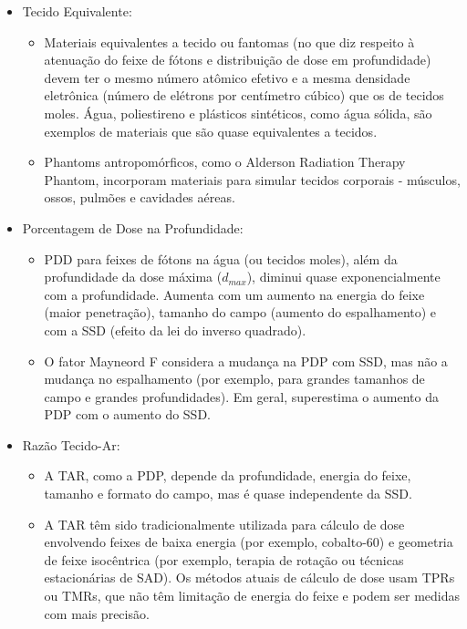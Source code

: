 \documentclass[11pt,a4paper]{article}
\newcounter{exemplo}
\begin{document}
	\begin{exemplo}
		\begin{itemize}
			\item Tecido Equivalente:
				\begin{itemize}[label=\textcolor{CarnationPink}{$\star$}]
					\item Materiais equivalentes a tecido ou fantomas (no que diz respeito à atenuação do feixe de fótons e distribuição de dose em profundidade) devem ter o mesmo número atômico efetivo e a mesma densidade eletrônica (número de elétrons por centímetro cúbico) que os de tecidos moles. Água, poliestireno e plásticos sintéticos, como água sólida, são exemplos de materiais que são quase equivalentes a tecidos.
					\item Phantoms antropomórficos, como o Alderson Radiation Therapy Phantom, incorporam materiais para simular tecidos corporais - músculos, ossos, pulmões e cavidades aéreas.
				\end{itemize}
			\item Porcentagem de Dose na Profundidade:
				\begin{itemize}[label=\textcolor{CarnationPink}{$\star$}]
					\item PDD para feixes de fótons na água (ou tecidos moles), além da profundidade da dose máxima ($d_{max}$), diminui quase exponencialmente com a profundidade. Aumenta com um aumento na energia do feixe (maior penetração), tamanho do campo (aumento do espalhamento) e com a SSD (efeito da lei do inverso quadrado).
					\item O fator Mayneord F considera a mudança na PDP com SSD, mas não a mudança no espalhamento (por exemplo, para grandes tamanhos de campo e grandes profundidades). Em geral, superestima o aumento da PDP com o aumento do SSD.
				\end{itemize}
			\item Razão Tecido-Ar:
				\begin{itemize}[label=\textcolor{CarnationPink}{$\star$}]
					\item A TAR, como a PDP, depende da profundidade, energia do feixe, tamanho e formato do campo, mas é quase independente da SSD.
					\item A TAR têm sido tradicionalmente utilizada para cálculo de dose envolvendo feixes de baixa energia (por exemplo, cobalto-60) e geometria de feixe isocêntrica (por exemplo, terapia de rotação ou técnicas estacionárias de SAD). Os métodos atuais de cálculo de dose usam TPRs ou TMRs, que não têm limitação de energia do feixe e podem ser medidas com mais precisão.

\end{itemize}
\end{itemize}
\end{exemplo}
\end{document}
